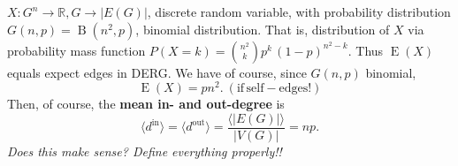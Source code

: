 \begin{remark}
  $X: G^n \to \mathbb{R}, G \to |E(G)|$, discrete random variable,
  with probability distribution $G(n,p) =\operatorname{B}(n^2,p)$,
  binomial distribution. That is, distribution of $X$ via probability
  mass function $P(X=k) = {{n^2} \choose k} p^k\,(1-p)^{n^2-k}$. Thus
  $\operatorname{E}(X)$ equals expect edges in DERG. We have of
  course, since $G(n,p)$ binomial,
  \[
  \operatorname{E}(X) = pn^2. \mathrm{\:(if\,self-edges!)}
  \]
  Then, of course, the \textbf{mean in- and out-degree} is \[ \langle
  d^{\mathrm{in}} \rangle = \langle d^{\mathrm{out}} \rangle =
  \frac{\langle |E(G)| \rangle}{|V(G)|} = np.\] \textit{Does this make
    sense? Define everything properly!!}
\end{remark}






